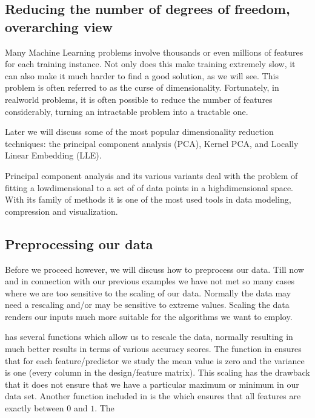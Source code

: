 \documentclass[letterpaper,10pt,english]{sphinxmanual}
\begin{document}
\noindent{}


\subsection{Reducing the number of degrees of freedom, overarching view}
\label{\detokenize{chapter4:reducing-the-number-of-degrees-of-freedom-overarching-view}}
Many Machine Learning problems involve thousands or even millions of
features for each training instance. Not only does this make training
extremely slow, it can also make it much harder to find a good
solution, as we will see. This problem is often referred to as the
curse of dimensionality.  Fortunately, in real\sphinxhyphen{}world problems, it is
often possible to reduce the number of features considerably, turning
an intractable problem into a tractable one.

Later  we will discuss some of the most popular dimensionality reduction
techniques: the principal component analysis (PCA), Kernel PCA, and
Locally Linear Embedding (LLE).

Principal component analysis and its various variants deal with the
problem of fitting a low\sphinxhyphen{}dimensional  to a set of of
data points in a high\sphinxhyphen{}dimensional space. With its family of methods it
is one of the most used tools in data modeling, compression and
visualization.


\subsection{Preprocessing our data}
\label{\detokenize{chapter4:preprocessing-our-data}}
Before we proceed however, we will discuss how to preprocess our
data. Till now and in connection with our previous examples we have
not met so many cases where we are too sensitive to the scaling of our
data. Normally the data may need a rescaling and/or may be sensitive
to extreme values. Scaling the data renders our inputs much more
suitable for the algorithms we want to employ.

 has several functions which allow us to rescale the
data, normally resulting in much better results in terms of various
accuracy scores.  The  function in 
ensures that for each feature/predictor we study the mean value is
zero and the variance is one (every column in the design/feature
matrix).  This scaling has the drawback that it does not ensure that
we have a particular maximum or minimum in our data set. Another
function included in  is the  which
ensures that all features are exactly between \(0\) and \(1\). The
\end{document}
